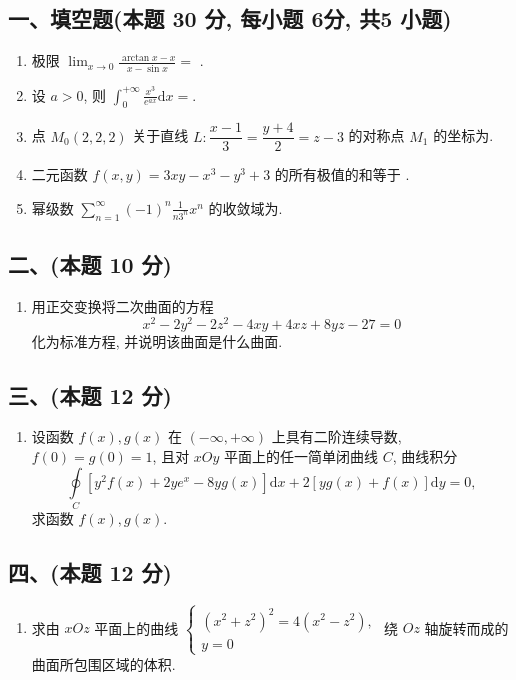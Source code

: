 \subsection*{一、填空题(本题 30 分,  每小题 6分,  共5 小题)}
\begin{enumerate}
    \item 极限 $\displaystyle\lim_{x \to 0} \frac{\arctan x - x}{x - \sin x} =$ \underline{\quad \quad}.
    \item 设 $a > 0$, 则 $\displaystyle\int_{0}^{+\infty} \frac{x^3}{e^{ax}} \mathrm{d}x =$\underline{\quad \quad}.
    \item 点 $M_0(2, 2, 2)$ 关于直线 $L: \dfrac{x - 1}{3} = \dfrac{y + 4}{2} = z - 3$ 的对称点 $M_1$ 的坐标为\underline{\quad \quad}.
    \item 二元函数 $f(x, y) = 3xy - x^3 - y^3 + 3$ 的所有极值的和等于 \underline{\quad \quad}.
    \item 幂级数 $\displaystyle\sum_{n=1}^{\infty} (-1)^n \frac{1}{n 3^n} x^n$ 的收敛域为\underline{\quad \quad}.
\end{enumerate}

\subsection*{二、(本题 10 分)}
\begin{enumerate}[start=6]
    \item 用正交变换将二次曲面的方程
          \[
              x^2 - 2y^2 - 2z^2 - 4xy + 4xz + 8yz - 27 = 0
          \]
          化为标准方程, 并说明该曲面是什么曲面.
\end{enumerate}

\subsection*{三、(本题 12 分)}
\begin{enumerate}[start=7]
    \item 设函数 $f(x), g(x)$ 在 $(-\infty, +\infty)$ 上具有二阶连续导数, $f(0) = g(0) = 1$, 且对 $xOy$ 平面上的任一简单闭曲线 $C$, 曲线积分
          \[
              \oint\limits_C [y^2 f(x) + 2ye^x - 8yg(x)] \mathrm{d}x + 2[yg(x) + f(x)] \mathrm{d}y = 0,
          \]
          求函数 $f(x), g(x)$.
\end{enumerate}

\subsection*{四、(本题 12 分)}
\begin{enumerate}[start=8]
    \item 求由 $xOz$ 平面上的曲线
          $\begin{cases}
                  (x^2 + z^2)^2 = 4(x^2 - z^2), \\
                  y = 0
              \end{cases}$
          绕 $Oz$ 轴旋转而成的曲面所包围区域的体积.
\end{enumerate}

